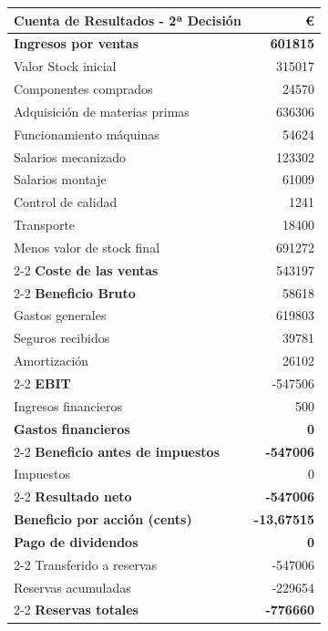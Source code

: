 
\begin{table}[h]
    \centering
    \begin{tabular}{lr}
        \textbf{Cuenta de Resultados - 2ª Decisión} & \textbf{€} \\
        \hline
        \textbf{Ingresos por ventas}                & \textbf{601815} \\
        Valor Stock inicial                         & 315017 \\
        Componentes comprados                       & 24570 \\
        Adquisición de materias primas              & 636306 \\
        Funcionamiento máquinas                     & 54624 \\
        Salarios mecanizado                         & 123302 \\
        Salarios montaje                            & 61009 \\
        Control de calidad                          & 1241 \\
        Transporte                                  & 18400 \\
        Menos valor de stock final                  & 691272 \\
        \cline{2-2}
        \textbf{Coste de las ventas}                & 543197 \\
        \cline{2-2}
        \textbf{Beneficio Bruto}                    & 58618 \\
        Gastos generales                            & 619803 \\
        Seguros recibidos                           & 39781 \\
        Amortización                                & 26102 \\
        \cline{2-2}
        \textbf{EBIT}                               & -547506 \\
        Ingresos financieros                        & 500 \\
        \textbf{Gastos financieros}                 & \textbf{0} \\
        \cline{2-2}
        \textbf{Beneficio antes de impuestos}       & \textbf{-547006} \\
        Impuestos                                   & 0 \\
        \cline{2-2}
        \textbf{Resultado neto}                     & \textbf{-547006} \\
        \textbf{Beneficio por acción (cents)}       & \textbf{-13,67515} \\
        \textbf{Pago de dividendos}                 & \textbf{0} \\
        \cline{2-2}
        Transferido a reservas                      & -547006 \\
        Reservas acumuladas                         & -229654 \\
        \cline{2-2}
        \textbf{Reservas totales}                   & \textbf{-776660}
    \end{tabular}
\end{table}

